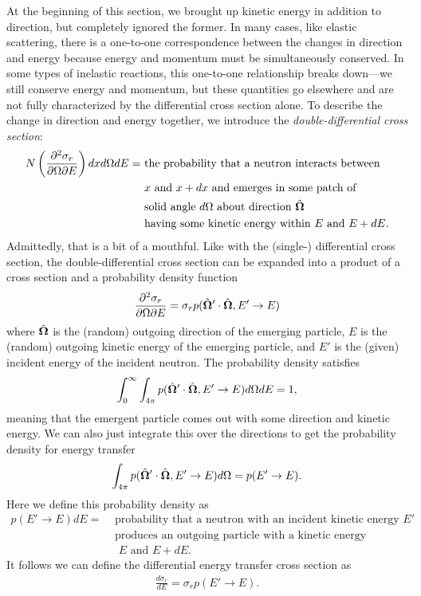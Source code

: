 At the beginning of this section, we brought up kinetic energy in addition to direction, but completely ignored the former. In many cases, like elastic scattering, there is a one-to-one correspondence between the changes in direction and energy because energy and momentum must be simultaneously conserved. In some types of inelastic reactions, this one-to-one relationship breaks down---we still conserve energy and momentum, but these quantities go elsewhere and are not fully characterized by the differential cross section alone. To describe the change in direction and energy together, we introduce the \emph{double-differential cross section}:
\begin{align}
  N \left( \frac{\partial^2 \sigma_r}{\partial \Omega \partial E} \right) dx d\Omega dE
  = &\text{ the probability that a neutron interacts between  } \nonumber \\
    &\text{ $x$ and $x + dx$ and emerges in some patch of } \nonumber \\
    &\text{ solid angle $d\Omega$ about direction $\hat{\mathbf{\Omega}}$  } \nonumber \\
    &\text{ having some kinetic energy within $E$ and $E + dE$.} \nonumber
\end{align}
Admittedly, that is a bit of a mouthful. Like with the (single-) differential cross section, the double-differential cross section can be expanded into a product of a cross section and a probability density function
\begin{align}
  \frac{\partial^2 \sigma_r}{\partial \Omega \partial E} = \sigma_r p( \hat{\mathbf{\Omega}}' \cdot \hat{\mathbf{\Omega}}, E' \rightarrow E )
\end{align}
where $\hat{\mathbf{\Omega}}$ is the (random) outgoing direction of the emerging particle, $E$ is the (random) outgoing kinetic energy of the emerging particle, and $E'$ is the (given) incident energy of the incident neutron. The probability density satisfies
\begin{align}
  \int_0^\infty \int_{4\pi} p( \hat{\mathbf{\Omega}}' \cdot \hat{\mathbf{\Omega}}, E' \rightarrow E ) d\Omega dE = 1,
\end{align} 
meaning that the emergent particle comes out with some direction and kinetic energy. We can also just integrate this over the directions to get the probability density for energy transfer
\begin{align}
   \int_{4\pi} p( \hat{\mathbf{\Omega}}' \cdot \hat{\mathbf{\Omega}}, E' \rightarrow E ) d\Omega = p(E' \rightarrow E) .
\end{align}
Here we define this probability density as
\begin{align}
  p(E' \rightarrow E) dE = 
  &\text{ probability that a neutron with an incident kinetic energy $E'$} \nonumber \\
  &\text{ produces an outgoing particle with a kinetic energy between} \nonumber \\
  &\text{ $E$ and $E + dE$.} \nonumber
\end{align}
It follows we can define the differential energy transfer cross section as
\begin{align}
  \frac{d\sigma_r}{dE} = \sigma_r p(E' \rightarrow E) .
\end{align}

